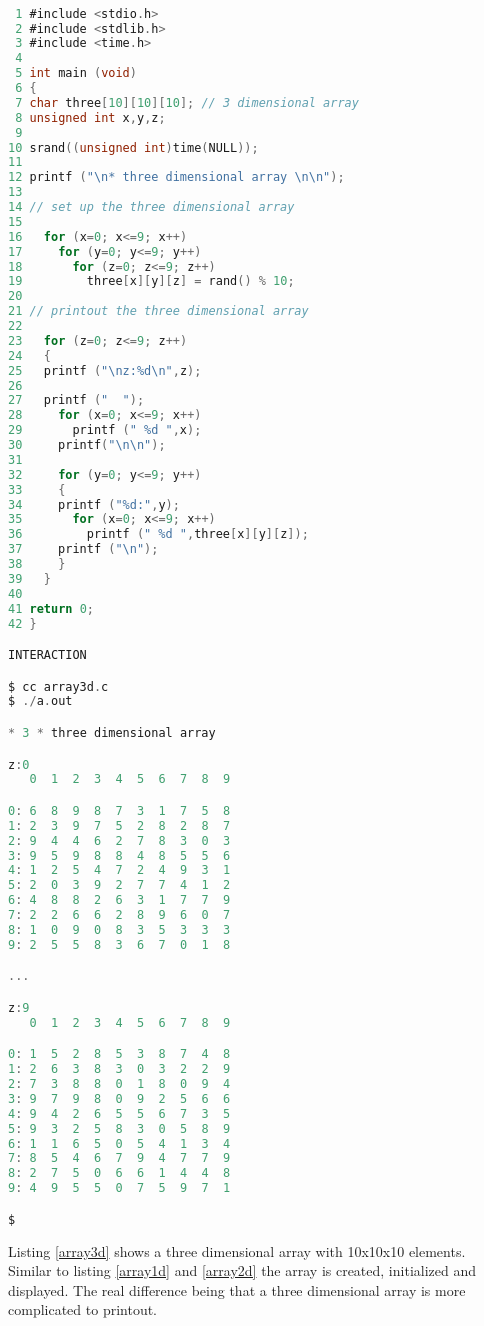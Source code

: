 \begin{lstlisting}[language=C,showstringspaces=false,caption={File: array3d.c, three dimensional array},captionpos=b,label=array3d]

 1 #include <stdio.h>
 2 #include <stdlib.h>
 3 #include <time.h>
 4 
 5 int main (void)
 6 {
 7 char three[10][10][10]; // 3 dimensional array
 8 unsigned int x,y,z;
 9 
10 srand((unsigned int)time(NULL));
11 
12 printf ("\n* three dimensional array \n\n");
13 
14 // set up the three dimensional array
15 
16   for (x=0; x<=9; x++)
17     for (y=0; y<=9; y++)
18       for (z=0; z<=9; z++)
19         three[x][y][z] = rand() % 10;
20 
21 // printout the three dimensional array
22 
23   for (z=0; z<=9; z++)
24   {
25   printf ("\nz:%d\n",z);
26 
27   printf ("  ");
28     for (x=0; x<=9; x++)  
29       printf (" %d ",x);
30     printf("\n\n");
31 
32     for (y=0; y<=9; y++)
33     {
34     printf ("%d:",y);
35       for (x=0; x<=9; x++)
36         printf (" %d ",three[x][y][z]);
37     printf ("\n");
38     }
39   }
40 
41 return 0;
42 }

INTERACTION

$ cc array3d.c
$ ./a.out

* 3 * three dimensional array 

z:0
   0  1  2  3  4  5  6  7  8  9 

0: 6  8  9  8  7  3  1  7  5  8 
1: 2  3  9  7  5  2  8  2  8  7 
2: 9  4  4  6  2  7  8  3  0  3 
3: 9  5  9  8  8  4  8  5  5  6 
4: 1  2  5  4  7  2  4  9  3  1 
5: 2  0  3  9  2  7  7  4  1  2 
6: 4  8  8  2  6  3  1  7  7  9 
7: 2  2  6  6  2  8  9  6  0  7 
8: 1  0  9  0  8  3  5  3  3  3 
9: 2  5  5  8  3  6  7  0  1  8 

...

z:9
   0  1  2  3  4  5  6  7  8  9 

0: 1  5  2  8  5  3  8  7  4  8 
1: 2  6  3  8  3  0  3  2  2  9 
2: 7  3  8  8  0  1  8  0  9  4 
3: 9  7  9  8  0  9  2  5  6  6 
4: 9  4  2  6  5  5  6  7  3  5 
5: 9  3  2  5  8  3  0  5  8  9 
6: 1  1  6  5  0  5  4  1  3  4 
7: 8  5  4  6  7  9  4  7  7  9 
8: 2  7  5  0  6  6  1  4  4  8 
9: 4  9  5  5  0  7  5  9  7  1 

$

\end{lstlisting}

Listing \ref{array3d} shows a three dimensional array with 10x10x10 elements. Similar to listing \ref{array1d} and \ref{array2d} the array is created, initialized and displayed. The real difference being that a three dimensional array is more complicated to printout. 

